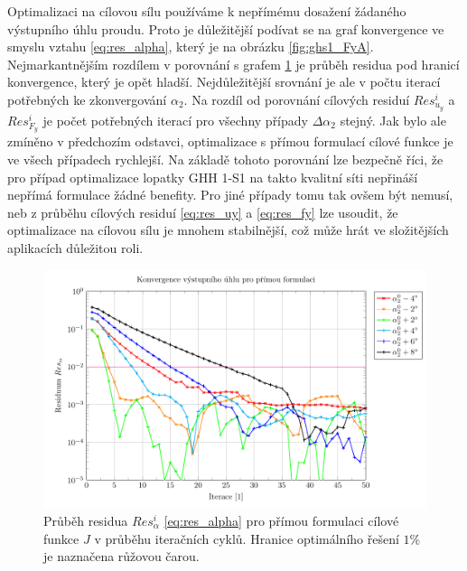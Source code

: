Optimalizaci na cílovou sílu používáme k nepřímému dosažení žádaného výstupního úhlu proudu. Proto je důležitější podívat se na graf konvergence ve smyslu vztahu \ref{eq:res_alpha}, který je na obrázku \ref{fig:ghs1_FyA}. Nejmarkantnějším rozdílem v porovnání s grafem \ref{fig:ghs1_UyA} je průběh residua pod hranicí konvergence, který je opět hladší. Nejdůležitější srovnání je ale v počtu iterací potřebných ke zkonvergování $ \alpha_2 $. Na rozdíl od porovnání cílových residuí $ Res_{u_y}^i $ a $ Res_{F_y}^i $ je počet potřebných iterací pro všechny případy $ \Delta\alpha_2 $ stejný. Jak bylo ale zmíněno v předchozím odstavci, optimalizace s přímou formulací cílové funkce je ve všech případech rychlejší. Na základě tohoto porovnání lze bezpečně říci, že pro případ optimalizace lopatky GHH 1-S1 na takto kvalitní síti nepřináší nepřímá formulace žádné benefity. Pro jiné případy tomu tak ovšem být nemusí, neb z průběhu cílových residuí \ref{eq:res_uy} a \ref{eq:res_fy} lze usoudit, že optimalizace na cílovou sílu je mnohem stabilnější, což může hrát ve složitějších aplikacích důležitou roli.
\begin{figure}[H]
	\includegraphics[width=1.0\columnwidth]{img/UyA.pdf}
	\caption[Průběh residua $ Res_{\alpha}^i $, přímá formulace]{Průběh residua $ Res_{\alpha}^i $ \ref{eq:res_alpha} pro přímou formulaci cílové funkce $ J $ v průběhu iteračních cyklů. Hranice optimálního řešení $ 1\% $ je naznačena růžovou čarou.}
	\label{fig:ghs1_UyA}
\end{figure}
